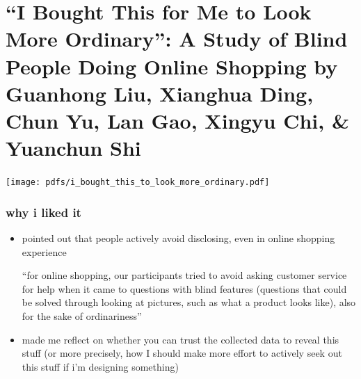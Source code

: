 \documentclass[aspectratio=169,10pt]{beamer} %
\begin{document}
\section[``I Bought This for Me to Look More Ordinary'': A Study of Blind People Doing Online Shopping]{``I Bought This for Me to Look More Ordinary'': A Study of Blind People Doing Online Shopping {\scriptsize \color{Black} by \textbf{Guanhong Liu}, \textbf{Xianghua Ding}, \textbf{Chun Yu}, \textbf{Lan Gao}, \textbf{Xingyu Chi}, \& \textbf{Yuanchun Shi}}}

\begin{frame}[t] %
\texttt{[image: pdfs/i\_bought\_this\_to\_look\_more\_ordinary.pdf]}
\end{frame}

\begin{frame}\frametitle{why i liked it}
    \begin{itemize}
    \item pointed out that people actively avoid disclosing, even in online shopping experience
    {\itshape
\vspace{1em}

``for online shopping, our participants tried to avoid asking customer service for help when it came to questions with blind features (questions that could be solved through looking at pictures, such as what a product looks like), also for the sake of ordinariness''

\vspace{1em}
}
      \item made me reflect on whether you can trust the  collected data to reveal this stuff (or more precisely, how I should make more effort to actively seek out this stuff if i'm designing something)
    \end{itemize}
\end{frame}
\end{document}
